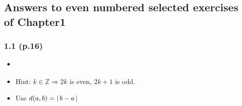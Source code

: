 \documentclass[11pt]{amsbook}
\begin{document}


\subsection{Answers to even numbered selected exercises of Chapter1}

\subsubsection*{1.1 (p.16)}
\begin{itemize}
    \item[ 2.] 
    \begin{multicols}{2}
    \end{multicols}
    \item[ 6.] Hint: $k\in\mathbb{Z} \Rightarrow 2k$ is even, $2k+1$ is odd.
    \item[10.] Use $d(a,b)=\left \lvert \, b-a \, \right \rvert$
\end{itemize}
\end{document}
